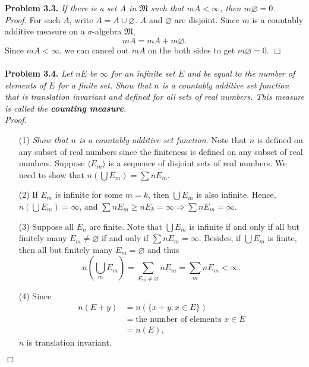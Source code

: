 \documentclass{article}
\begin{document}



\textbf{Problem 3.3.}
\emph{If there is a set $A$ in $\mathfrak{M}$ such that $mA < \infty$,
then $m\varnothing = 0$.} \\



\emph{Proof.}
For such $A$, write $A = A \cup \varnothing$.
$A$ and $\varnothing$ are disjoint.
Since $m$ is a countably additive measure
on a $\sigma$-algebra $\mathfrak{M}$,
\[
  mA = mA + m\varnothing.
\]
Since $mA < \infty$,
we can cancel out $mA$ on the both sides to get
$m\varnothing = 0$.
$\Box$ \\\\






\textbf{Problem 3.4.}
\emph{Let $nE$ be $\infty$ for an infinite set $E$ and
be equal to the number of elements of $E$ for a finite set.
Show that $n$ is a countably additive set function that is translation invariant and
defined for all sets of real numbers.
This measure is called the \textbf{counting measure}.} \\



\emph{Proof.}
\begin{enumerate}
\item[(1)]
  \emph{Show that $n$ is a countably additive set function.}
  Note that $n$ is defined on any subset of real numbers
  since the finiteness is defined on any subset of real numbers.
  Suppose $\langle E_m \rangle$ is a sequence of disjoint sets of real numbers.
  We need to show that $n\left( \bigcup E_m \right) = \sum n E_m$.

\item[(2)]
  If $E_m$ is infinite for some $m = k$, then $\bigcup E_m$ is also infinite.
  Hence, $n \left( \bigcup E_m \right) = \infty$,
  and $\sum n E_m \geq n E_k = \infty \Longrightarrow \sum n E_m = \infty$.

\item[(3)]
  Suppose all $E_n$ are finite.
  Note that
  $\bigcup E_m$ is infinite if and only if all but finitely many $E_m \neq \varnothing$
  if and only if $\sum n E_m = \infty$.
  Besides, if $\bigcup E_m$ is finite, then all but finitely many $E_m = \varnothing$
  and thus
  \[
    n\left( \bigcup_m E_m \right)
    = \sum_{E_m \neq \varnothing} n E_m
    = \sum_{m} n E_m
    < \infty.
  \]

\item[(4)]
  Since
  \begin{align*}
    n(E+y)
    &= n(\{ x + y : x \in E\}) \\
    &= \text{the number of elements $x \in E$} \\
    &= n(E),
  \end{align*}
  $n$ is translation invariant.
\end{enumerate}
$\Box$ \\\\
\end{document}
